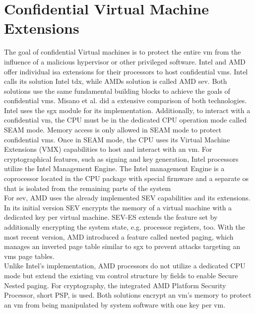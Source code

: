 \section{Confidential Virtual Machine Extensions}
\label{section:20:confidential_vms}
The goal of confidential Virtual machines is to protect the entire \gls{vm} from
the influence of a malicious hypervisor or other privileged software. Intel and
AMD offer individual \gls{isa} extensions for their processors to host
confidential \glspl{vm}. Intel calls its solution Intel \gls{tdx}, while AMDs
solution is called AMD \gls{sev}.\cite{tdx_whitepaper,kaplan_amd_2020} Both
solutions use the same fundamental building blocks to achieve the goals of
confidential \glspl{vm}. Misano et al. did a extensive comparison of both
technologies.\cite{misono_confidential_2024} Intel uses the \gls{sgx} module for
its implementation. Additionally, to interact with a confidential \gls{vm}, the
CPU must be in the dedicated CPU operation mode called SEAM mode. Memory access
is only allowed in SEAM mode to protect confidential \glspl{vm}. Once in SEAM
mode, the CPU uses its Virtual Machine Extensions (VMX) capabilities to host and
interact with an \gls{vm}. For cryptographical features, such as signing and
key generation, Intel processors utilize the Intel Management Engine. The Intel
management Engine is a coprocessor located in the CPU package with special
firmware and a separate \gls{os} that is isolated from the remaining parts of
the system\\

For \gls{sev}, AMD uses the already implemented SEV capabilities and its
extensions. In its initial version SEV encrypts the memory of a virtual machine
with a dedicated key per virtual machine. SEV-ES extends the feature set by
additionally encrypting the system state, e.g. processor registers, too. With
the most recent version, AMD introduced a feature called nested paging, which
manages an inverted page table similar to \gls{sgx} to prevent attacks targeting
an \gls{vm}s page tables.\\

Unlike Intel's implementation, AMD processors do not utilize a dedicated CPU
mode but extend the existing \gls{vm} control structure by fields to enable
Secure Nested paging. For cryptography, the integrated AMD Platform Security
Processor, short PSP, is used. Both solutions encrypt an \gls{vm}'s memory to
protect an \gls{vm} from being manipulated by system software with one key per
\gls{vm}.\\

